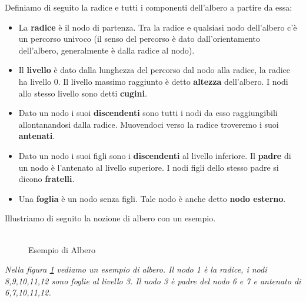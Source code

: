 \begin{definition}
Definiamo di seguito la radice e tutti i componenti dell'albero a partire da essa:\\
\begin{itemize}
\item La \textbf{radice} è il nodo di partenza. Tra la radice e qualsiasi nodo dell'albero c'è un percorso univoco (il senso del percorso è dato dall'orientamento dell'albero, generalmente è dalla radice al nodo).
\item Il \textbf{livello} è dato dalla lunghezza del percorso dal nodo alla radice, la radice ha livello 0. Il livello massimo raggiunto è detto \textbf{altezza} dell'albero. I nodi allo stesso livello sono detti \textbf{cugini}.
\item Dato un nodo i suoi \textbf{discendenti} sono tutti i nodi da esso raggiungibili allontanandosi dalla radice. Muovendoci verso la radice troveremo i suoi \textbf{antenati}.
\item Dato un nodo i suoi figli sono i \textbf{discendenti} al livello inferiore. Il \textbf{padre} di un nodo è l'antenato al livello superiore. I nodi figli dello stesso padre si dicono \textbf{fratelli}.
\item Una \textbf{foglia} è un nodo senza figli. Tale nodo è anche detto \textbf{nodo esterno}.
\end{itemize}
\end{definition}
Illustriamo di seguito la nozione di albero con un esempio.\\\\
\begin{example}
\begin{figure}[H]
\centering
{}
\caption{Esempio di Albero}\label{fig:albero}
\end{figure}
\begin{center}
\textit{Nella figura \ref{fig:albero} vediamo un esempio di albero. Il nodo 1 è la radice, i nodi 8,9,10,11,12 sono foglie al livello 3. Il nodo 3 è padre del nodo 6 e 7 e antenato di 6,7,10,11,12. 
}
\end{center}
\end{example}

